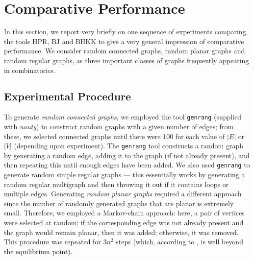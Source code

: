 

\section{Comparative Performance}  

In this section, we report very briefly on one sequence of experiments comparing the tools HPR, BJ and BHKK to give
a very general impression of comparative performance. We consider random connected graphs, random planar graphs and random regular graphs, as three important classes of graphs frequently appearing in combinatorics. 

\subsection{Experimental Procedure}
To generate {\em random connected graphs}, we employed the tool \verb+genrang+ (supplied with {\em nauty}) to construct random graphs with a given number of edges; from these, we selected connected graphs until there were 100 for each value of $|E|$ or $|V|$ (depending upon experiment).  The \verb+genrang+ tool constructs a random graph by generating a random edge, adding it to the graph (if not already present), and then repeating this until enough edges have been added.  We also used \verb+genrang+ to generate random simple regular graphs --- this essentially works by generating a random regular multigraph and then throwing it out if it contains loops or multiple edges.  Generating {\em random planar graphs} required a different approach since the number of randomly generated graphs that are planar is extremely small.  Therefore, we employed a Markov-chain approach:  here, a pair of vertices were selected at random; if the corresponding edge was not already present and the graph would remain planar, then it was added; otherwise, it was removed.  This procedure was repeated for $3n^2$ steps (which, according to \cite{DVW96}, is well beyond the equilibrium point).

